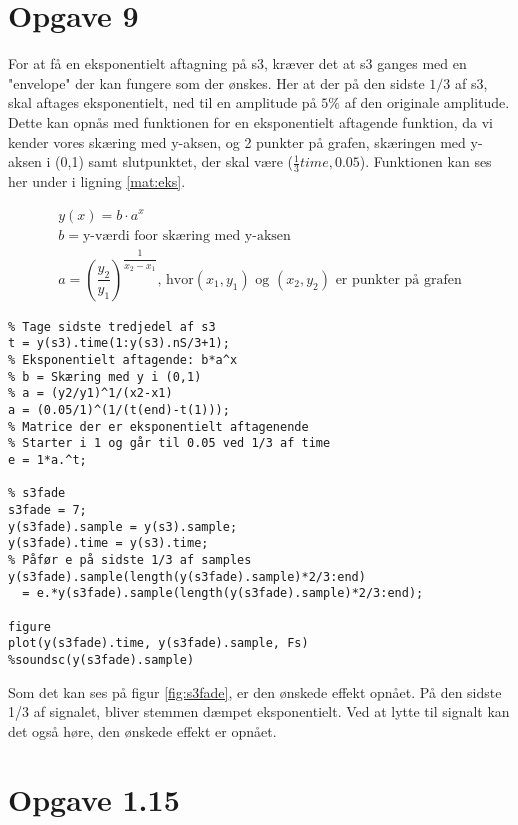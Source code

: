 \documentclass[../main.tex]{subfiles}
\begin{document}
\section*{Opgave 9}

For at få en eksponentielt aftagning på s3, kræver det at s3 ganges med en "envelope" der kan fungere som der ønskes. Her at der på den sidste \( 1 /3 \) af s3, skal aftages eksponentielt, ned til en amplitude på \( 5\% \) af den originale amplitude. Dette kan opnås med funktionen for en eksponentielt aftagende funktion, da vi kender vores skæring med y-aksen, og 2 punkter på grafen, skæringen med y-aksen i (0,1) samt slutpunktet, der skal være (\(\frac{1}{3}time, 0.05\)). Funktionen kan ses her under i ligning \ref{mat:eks}. 

\begin{gather}
  y(x) = b \cdot a^x \label{mat:eks}\\
  b = \text{y-værdi foor skæring med y-aksen} \\
  a = \left(\dfrac{y_2}{y_1}\right)^{ \dfrac{1}{x_2-x_1}} \text{, hvor} (x_1,y_1) \text{ og }  (x_2,y_2)  \text{ er punkter på grafen}
\end{gather}

\begin{lstlisting}[caption={Fade out af s3}label=lst:s3fade]
%% Exercise 9
% Tage sidste tredjedel af s3
t = y(s3).time(1:y(s3).nS/3+1);
% Eksponentielt aftagende: b*a^x
% b = Skæring med y i (0,1)
% a = (y2/y1)^1/(x2-x1)
a = (0.05/1)^(1/(t(end)-t(1)));
% Matrice der er eksponentielt aftagenende
% Starter i 1 og går til 0.05 ved 1/3 af time
e = 1*a.^t;

% s3fade
s3fade = 7;
y(s3fade).sample = y(s3).sample;
y(s3fade).time = y(s3).time;
% Påfør e på sidste 1/3 af samples
y(s3fade).sample(length(y(s3fade).sample)*2/3:end) 
  = e.*y(s3fade).sample(length(y(s3fade).sample)*2/3:end);

figure
plot(y(s3fade).time, y(s3fade).sample, Fs)
%soundsc(y(s3fade).sample)
\end{lstlisting}

Som det kan ses på figur \ref{fig:s3fade}, er den ønskede effekt opnået. På den sidste 1/3 af signalet, bliver stemmen dæmpet eksponentielt. Ved at lytte til signalt kan det også høre, den ønskede effekt er opnået.



\section*{Opgave 1.15}
\end{document}
